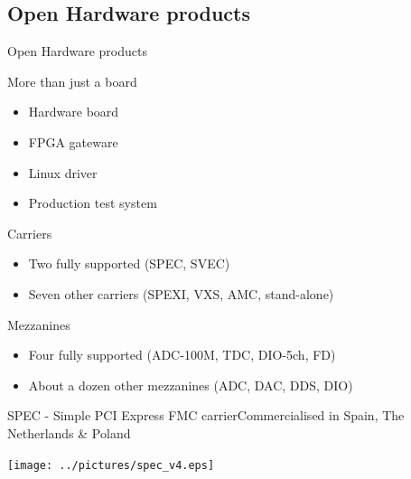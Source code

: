 \documentclass[compress,red]{beamer}
\begin{document}
\subsection{Open Hardware products}

\begin{frame}{Open Hardware products}

  \begin{block}{More than just a board}
    \begin{itemize}
    \item Hardware board
    \item FPGA gateware
    \item Linux driver
    \item Production test system
    \end{itemize}
  \end{block}

  \begin{block}{Carriers}
    \begin{itemize}
    \item Two fully supported (SPEC, SVEC)
    \item Seven other carriers (SPEXI, VXS, AMC, stand-alone)
    \end{itemize}
  \end{block}


  \begin{block}{Mezzanines}
    \begin{itemize}
    \item Four fully supported (ADC-100M, TDC, DIO-5ch, FD)
    \item About a dozen other mezzanines (ADC, DAC, DDS, DIO)
    \end{itemize}
  \end{block}


  \note[item]{}

\end{frame}

\begin{frame}{SPEC - Simple PCI Express FMC carrier}{Commercialised in Spain, The Netherlands \& Poland}

  \begin{center}
    \texttt{[image: ../pictures/spec\_v4.eps]}
  \end{center}

  \note[item]{}

\end{frame}
\end{document}
